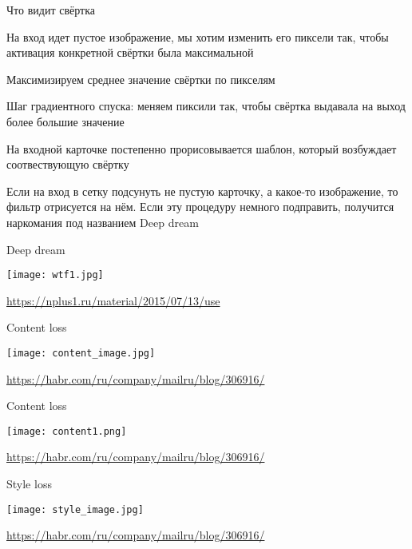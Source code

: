 \documentclass[notes,12pt, aspectratio=169]{beamer}
\newenvironment{wideitemize}{\itemize\addtolength{\itemsep}{10pt}}{\enditemize}
\begin{document}
\begin{frame}{Что видит свёртка}
\begin{wideitemize}

\item На вход идет пустое изображение, мы хотим изменить его пиксели так, чтобы активация конкретной свёртки была максимальной 

\item Максимизируем среднее значение свёртки по пикселям 

\item Шаг градиентного спуска: меняем пиксили так, чтобы свёртка выдавала на выход более большие значение 

\item На входной карточке постепенно прорисовывается шаблон, который возбуждает соотвествующую свёртку

\item Если на вход в сетку подсунуть не пустую карточку, а какое-то изображение, то фильтр отрисуется на нём. Если эту процедуру немного подправить, получится наркомания под названием \alert{Deep dream}
\end{wideitemize}
\end{frame}

\begin{frame}{Deep dream}
\begin{center}
\texttt{[image: wtf1.jpg]}
\end{center}
\vfill
\footnotesize
{\color{blue} \url{https://nplus1.ru/material/2015/07/13/use}}
\end{frame}


\begin{frame}{Content loss}
\begin{center}
\texttt{[image: content\_image.jpg]}
\end{center}
\vfill
\footnotesize
{\color{blue} \url{https://habr.com/ru/company/mailru/blog/306916/}}
\end{frame}

\begin{frame}{Content loss}
\begin{center}
\texttt{[image: content1.png]}
\end{center}
\vfill
\footnotesize
{\color{blue} \url{https://habr.com/ru/company/mailru/blog/306916/}}
\end{frame}



\begin{frame}{Style loss}
\begin{center}
\texttt{[image: style\_image.jpg]}
\end{center}
\vfill
\footnotesize
{\color{blue} \url{https://habr.com/ru/company/mailru/blog/306916/}}
\end{frame}
\end{document}
